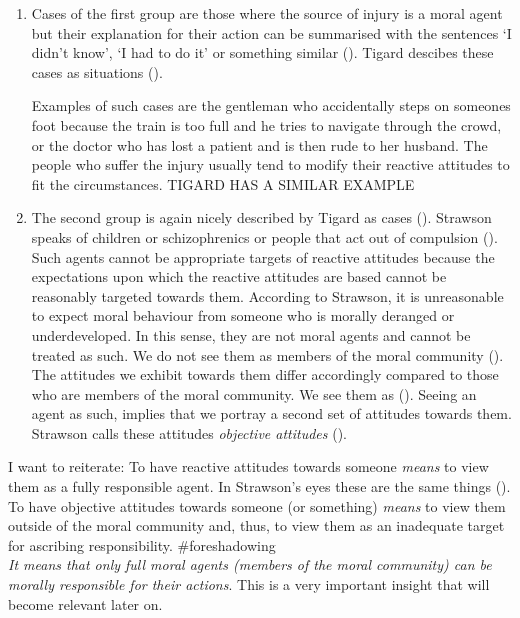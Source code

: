 \documentclass{article}
\begin{document}
\begin{enumerate}
	\item Cases of the first group are those where the source of injury is a
		moral agent but their explanation for their action can be
		summarised with the sentences `I didn't know', `I had to do it'
		or something similar (\cite[p.7-8]{Strawson1962}). Tigard
		descibes these cases as situations  
		(\cite[p.5]{Tigard_2020}).

		Examples of such cases are the gentleman who accidentally steps
		on someones foot because the train is too full and he tries to
		navigate through the crowd, or the doctor who has lost a patient
		and is then rude to her husband. The people who suffer the
		injury usually tend to modify their reactive attitudes to fit
		the circumstances.
		TIGARD HAS A SIMILAR EXAMPLE



	\item The second group is again nicely described by Tigard as cases
		 (\cite[p.5]{Tigard_2020}). Strawson speaks of children
		or schizophrenics or people that act out of compulsion
		(\cite[p.8-9]{Strawson1962}). Such
		agents cannot be appropriate targets of reactive attitudes
		because the expectations upon which the reactive attitudes are
		based cannot be reasonably targeted towards them. According to
		Strawson, it is unreasonable to expect moral behaviour from
		someone who is morally deranged or underdeveloped. In this
		sense, they are not moral agents and cannot be treated as such.
		We do not see them as members of the moral community
		(\cite[p.18]{Strawson1962}). The attitudes we exhibit towards
		them differ accordingly compared to those who are members of the
		moral community. We see them as 
		(\cite[p.8]{Strawson1962}). Seeing an agent as such, implies
		that we portray a second set of attitudes towards them. Strawson
		calls these attitudes \textit{objective attitudes}
		(\cite[p.9]{Strawson1962}). 
\end{enumerate}

I want to reiterate: To have reactive attitudes towards someone \textit{means}
to view them as a fully responsible agent. In Strawson's eyes these are the same
things (\cite[p.23]{Strawson1962}). To have objective attitudes towards someone (or something)
\textit{means} to view them outside of the moral community and, thus, to view
them as an inadequate target for ascribing responsibility. \#foreshadowing\\
\textit{It means that only full moral agents (members of the moral community) can be
morally responsible for their actions}.  This is a very important insight that
will become relevant later on.
\label{responsibility_implies_agency}
\end{document}
